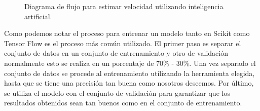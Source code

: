\begin{figure}[H]
    \centering
    \caption{Diagrama de flujo para estimar velocidad utilizando inteligencia artificial.}
    \label{fig:ModeloScikitTensorFlow}
\end{figure}


Como podemos notar el proceso para entrenar un modelo tanto en Scikit como Tensor Flow es el proceso más común utilizado. El primer paso es separar el conjunto de datos en un conjunto de entrenamiento y otro de validación normalmente esto se realiza en un porcentaje de 70\% - 30\%. Una vez separado el conjunto de datos se procede al entrenamiento utilizando la herramienta elegida, hasta que se tiene una precisión tan buena como nosotros deseemos. Por último, se utiliza el modelo con el conjunto de validación para garantizar que los resultados obtenidos sean tan buenos como en el conjunto de entrenamiento.

